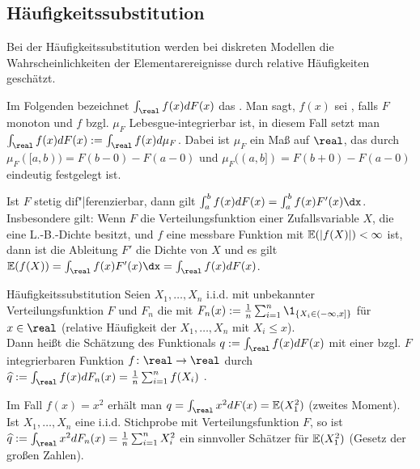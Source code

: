 \subsection{%
    Häufigkeitssubstitution%
}

\begin{Bem}
    Bei der Häufigkeitssubstitution werden bei diskreten Modellen die Wahrscheinlichkeiten
    der Elementarereignisse durch relative Häufigkeiten geschätzt.

    Im Folgenden bezeichnet $\int_\real f(x) dF(x)$ das
    .
    Man sagt, $f(x)$ sei , falls $F$ monoton und
    $f$ bzgl. $\mu_F$ Lebesgue-integrierbar ist, in diesem Fall setzt man
    $\int_\real f(x) dF(x) := \int_\real f(x) d\mu_F$.
    Dabei ist $\mu_F$ ein Maß auf $\real$, das durch
    $\mu_F([a, b)) = F(b-0) - F(a-0)$ und
    $\mu_F((a, b]) = F(b+0) - F(a-0)$ eindeutig festgelegt ist.

    Ist $F$ stetig dif"|ferenzierbar, dann gilt $\int_a^b f(x) dF(x) = \int_a^b f(x)F'(x) \dx$.
    Insbesondere gilt:
    Wenn $F$ die Verteilungsfunktion einer Zufallsvariable $X$, die eine L.-B.-Dichte besitzt,
    und $f$ eine messbare Funktion mit $\mathbb{E}(|f(X)|) < \infty$ ist,
    dann ist die Ableitung $F'$ die Dichte von $X$ und es gilt
    $\EE(f(X)) = \int_\real f(x)F'(x) \dx = \int_\real f(x) dF(x)$.
\end{Bem}

\linie

\begin{Def}{Häufigkeitssubstitution}
    Seien $X_1, \dotsc, X_n$ i.i.d. mit unbekannter Verteilungsfunktion $F$
    und $F_n$ die  mit
    $F_n(x) := \frac{1}{n} \sum_{i=1}^n \1_{\{X_i \in (-\infty, x]\}}$ für $x \in \real$
    (relative Häufigkeit der $X_1, \dotsc, X_n$ mit $X_i \le x$).\\
    Dann heißt die Schätzung des Funktionals $q := \int_\real f(x) dF(x)$
    mit einer bzgl. $F$ integrierbaren Funktion $f\colon \real \rightarrow \real$ durch
    $\widehat{q} := \int_\real f(x) dF_n(x) = \frac{1}{n} \sum_{i=1}^n f(X_i)$
    .
\end{Def}

\linie

\begin{Bsp}
    Im Fall $f(x) = x^2$ erhält man $q = \int_\real x^2 dF(x) = \EE(X_1^2)$ (zweites Moment).
    Ist $X_1, \dotsc, X_n$ eine i.i.d. Stichprobe mit Verteilungsfunktion $F$, so ist\\
    $\widehat{q} := \int_\real x^2 dF_n(x) = \frac{1}{n} \sum_{i=1}^n X_i^2$
    ein sinnvoller Schätzer für $\mathbb{E}(X_1^2)$ (Gesetz der großen Zahlen).
\end{Bsp}

